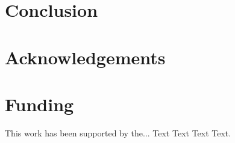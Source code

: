 \documentclass{bioinfo}
\begin{document}
%
%






\section{Conclusion}

\vspace*{-10pt}


\section*{Acknowledgements}

\vspace*{-12pt}

\section*{Funding}

This work has been supported by the... Text Text  Text Text.\vspace*{-12pt}

%
%
%
%
%
%
%
%

\end{document}
